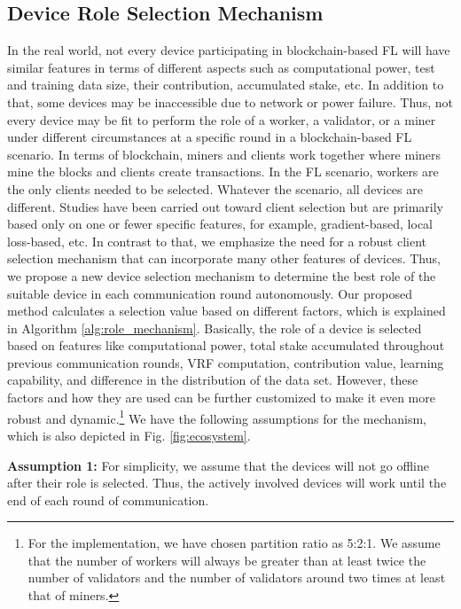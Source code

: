 \subsection{Device Role Selection Mechanism}
In the real world, 
not every device participating in blockchain-based FL will have similar features
in terms of different aspects such as computational power,
test and training data size,
their contribution, accumulated stake, etc.
In addition to that, 
some devices may be inaccessible due to
network or power failure.
Thus, not every device may be fit to perform the role of a worker, a validator, or a miner under different circumstances at a specific round in a blockchain-based FL scenario.
In terms of blockchain, miners and clients work together
where miners mine the blocks and
clients create transactions.
In the FL scenario, workers are the only clients needed to be selected.
Whatever the scenario, all devices are different.
Studies have been carried out toward client selection but are primarily based only on one or fewer specific
features, for example, gradient-based, local loss-based, etc.
In contrast to that, we emphasize the need for a robust client selection mechanism that can incorporate many other
features of devices.
Thus, we propose a new device selection mechanism to determine
the best role of the suitable device in each communication round autonomously.
Our proposed method calculates a selection value based on different factors, 
which is explained in Algorithm \ref{alg:role_mechanism}.
Basically, the role of a device is selected based on features like computational power,
total stake accumulated throughout previous communication rounds, 
VRF computation, contribution value, learning capability, and difference in the distribution of the data set.
However, these factors and how they are used can be further customized
to make it even more robust and dynamic.\footnote{For the implementation, we have chosen partition ratio as 5:2:1.
We assume that the number of workers will always be greater than at least twice the number of validators and the number of validators around two times at least that of miners.} We have the following assumptions for the mechanism, which is also depicted in Fig. \ref{fig:ecosystem}.

\textbf{Assumption 1:}
For simplicity, we assume that the devices will not go offline after their role is selected. 
Thus, the actively involved devices will work until the end of each round of communication.

